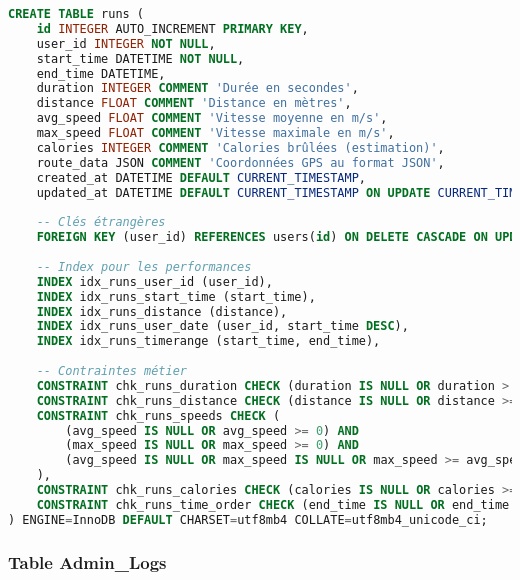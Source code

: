 \begin{lstlisting}[language=sql]
CREATE TABLE runs (
    id INTEGER AUTO_INCREMENT PRIMARY KEY,
    user_id INTEGER NOT NULL,
    start_time DATETIME NOT NULL,
    end_time DATETIME,
    duration INTEGER COMMENT 'Durée en secondes',
    distance FLOAT COMMENT 'Distance en mètres',
    avg_speed FLOAT COMMENT 'Vitesse moyenne en m/s',
    max_speed FLOAT COMMENT 'Vitesse maximale en m/s',
    calories INTEGER COMMENT 'Calories brûlées (estimation)',
    route_data JSON COMMENT 'Coordonnées GPS au format JSON',
    created_at DATETIME DEFAULT CURRENT_TIMESTAMP,
    updated_at DATETIME DEFAULT CURRENT_TIMESTAMP ON UPDATE CURRENT_TIMESTAMP,
    
    -- Clés étrangères
    FOREIGN KEY (user_id) REFERENCES users(id) ON DELETE CASCADE ON UPDATE CASCADE,
    
    -- Index pour les performances
    INDEX idx_runs_user_id (user_id),
    INDEX idx_runs_start_time (start_time),
    INDEX idx_runs_distance (distance),
    INDEX idx_runs_user_date (user_id, start_time DESC),
    INDEX idx_runs_timerange (start_time, end_time),
    
    -- Contraintes métier
    CONSTRAINT chk_runs_duration CHECK (duration IS NULL OR duration > 0),
    CONSTRAINT chk_runs_distance CHECK (distance IS NULL OR distance >= 0),
    CONSTRAINT chk_runs_speeds CHECK (
        (avg_speed IS NULL OR avg_speed >= 0) AND 
        (max_speed IS NULL OR max_speed >= 0) AND
        (avg_speed IS NULL OR max_speed IS NULL OR max_speed >= avg_speed)
    ),
    CONSTRAINT chk_runs_calories CHECK (calories IS NULL OR calories >= 0),
    CONSTRAINT chk_runs_time_order CHECK (end_time IS NULL OR end_time >= start_time)
) ENGINE=InnoDB DEFAULT CHARSET=utf8mb4 COLLATE=utf8mb4_unicode_ci;
\end{lstlisting}

\subsubsection{Table Admin\_Logs}

